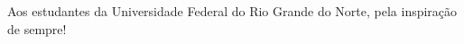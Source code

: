 \begin{dedicatoria}
   \vspace*{\fill}

{%
	\noindent\hspace{.5\textwidth}
	{\begin{minipage}{.5\textwidth}
			\begin{flushleft}
				Aos estudantes da Universidade Federal do Rio Grande do Norte, pela inspiração de sempre!
			\end{flushleft}
	\end{minipage}}%
\vspace*{3cm}
}%

\end{dedicatoria}

